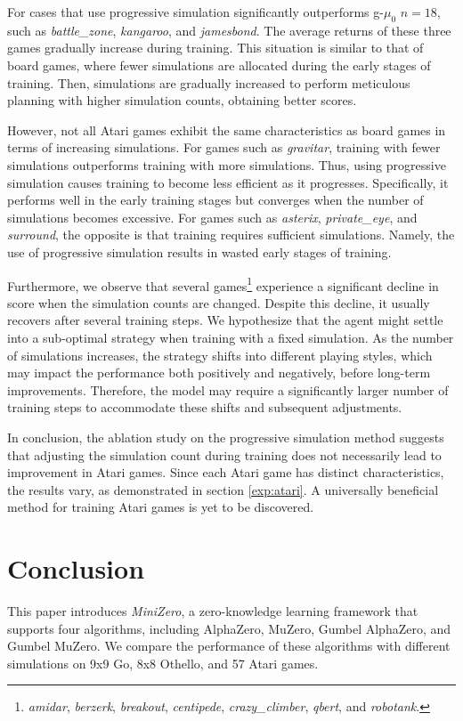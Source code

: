 For cases that use progressive simulation significantly outperforms g-$\mu_0$ $n=18$, such as \textit{battle\_zone}, \textit{kangaroo}, and \textit{jamesbond}.
The average returns of these three games gradually increase during training.
This situation is similar to that of board games, where fewer simulations are allocated during the early stages of training.
Then, simulations are gradually increased to perform meticulous planning with higher simulation counts, obtaining better scores.

However, not all Atari games exhibit the same characteristics as board games in terms of increasing simulations.
For games such as \textit{gravitar}, training with fewer simulations outperforms training with more simulations.
Thus, using progressive simulation causes training to become less efficient as it progresses.
Specifically, it performs well in the early training stages but converges when the number of simulations becomes excessive.
For games such as \textit{asterix}, \textit{private\_eye}, and \textit{surround}, the opposite is that training requires sufficient simulations.
Namely, the use of progressive simulation results in wasted early stages of training.

Furthermore, we observe that several games\footnote{\textit{amidar}, \textit{berzerk}, \textit{breakout}, \textit{centipede}, \textit{crazy\_climber}, \textit{qbert}, and \textit{robotank}.} experience a significant decline in score when the simulation counts are changed.
Despite this decline, it usually recovers after several training steps.
We hypothesize that the agent might settle into a sub-optimal strategy when training with a fixed simulation.
As the number of simulations increases, the strategy shifts into different playing styles, which may impact the performance both positively and negatively, before long-term improvements.
Therefore, the model may require a significantly larger number of training steps to accommodate these shifts and subsequent adjustments.

In conclusion, the ablation study on the progressive simulation method suggests that adjusting the simulation count during training does not necessarily lead to improvement in Atari games.
Since each Atari game has distinct characteristics, the results vary, as demonstrated in section \ref{exp:atari}.
A universally beneficial method for training Atari games is yet to be discovered.


\section{Conclusion}
This paper introduces \textit{MiniZero}, a zero-knowledge learning framework that supports four algorithms, including AlphaZero, MuZero, Gumbel AlphaZero, and Gumbel MuZero.
We compare the performance of these algorithms with different simulations on 9x9 Go, 8x8 Othello, and 57 Atari games.

